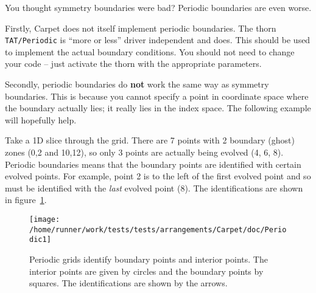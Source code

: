 \begin{enumerate}
  You thought symmetry boundaries were bad? Periodic boundaries are
  even worse.

  Firstly, Carpet does not itself implement periodic boundaries. The
  thorn {\tt TAT/Periodic} is ``more or less'' driver independent and
  does. This should be used to implement the actual boundary
  conditions. You should not need to change your code -- just activate
  the thorn with the appropriate parameters.

  Secondly, periodic boundaries do {\bf not} work the same way as
  symmetry boundaries. This is because you cannot specify a point in
  coordinate space where the boundary actually lies; it really lies in
  the index space. The following example will hopefully help.
  
  Take a 1D slice through the grid. There are 7 points with 2 boundary
  (ghost) zones (0,2 and 10,12), so only 3 points are actually being
  evolved (4, 6, 8). Periodic boundaries means that the boundary points
  are identified with certain evolved points. For example, point 2 is
  to the left of the first evolved point and so must be identified
  with the \textit{last} evolved point (8). The identifications are
  shown in figure~\ref{fig:Periodic1}.
  \begin{figure}[htbp]
    \begin{center}
      \texttt{[image: /home/runner/work/tests/tests/arrangements/Carpet/doc/Periodic1]}
      \caption{Periodic grids identify boundary points and interior
        points. The interior points are given by circles and the
        boundary points by squares. The identifications are shown by the
        arrows.}
      \label{fig:Periodic1}
    \end{center}
  \end{figure}


\end{enumerate}
